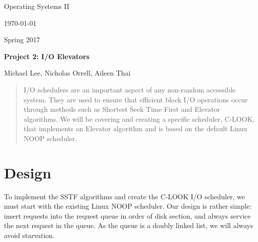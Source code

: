 \documentclass[draftclsnofoot, onecolumn]{IEEEtran}
\begin{document}
\begin{titlepage}
		\centering
        \scshape{
        	\huge Operating Systems II \par
            {\large\today}\par
            {\large Spring 2017}\par
            \vspace{.5in}
            \textbf{\Huge Project 2: I/O Elevators}\par
			\vfill
            {\Large Michael Lee, Nicholas Orrell, Aileen Thai}
            \vspace{20pt}
		}
\begin{abstract}
I/O schedulers are an important aspect of any non-random accessible system. They are used to ensure that efficient block I/O operations occur through methods such as Shortest Seek Time First and Elevator algorithms. We will be covering and creating a specific scheduler, C-LOOK, that implements an Elevator algorithm and is based on the default Linux NOOP scheduler. 
\end{abstract}
\end{titlepage}
\newpage
{}

\section{Design}
To implement the SSTF algorithms and create the C-LOOK I/O scheduler, we must start with the existing Linux NOOP scheduler. Our design is rather simple: insert requests into the request queue in order of disk section, and always service the next request in the queue. As the queue is a doubly linked list, we will always avoid starvation.
\end{document}
